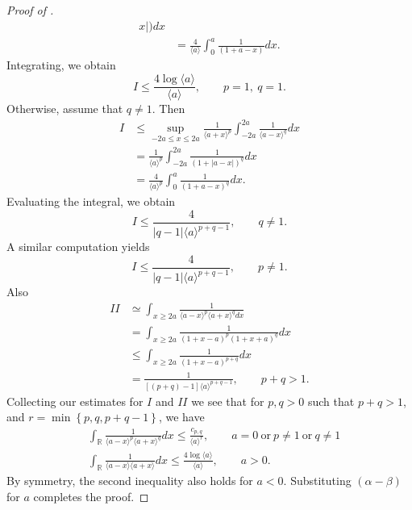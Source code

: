 \documentclass[12pt,reqno]{amsart}
\numberwithin{equation}{section}  %
\renewcommand{\cref}{\Cref}
\newcommand{\rr}{\mathbb{R}}
\begin{document}
\begin{proof}[Proof of \cref{lem:calc}]
\begin{equation*}
\begin{split}
{x
|)} d x
\\
& = \frac{4}{\langle a \rangle} \int_{0}^{a} \frac{1}{(1 + a -
x)} d x.
\end{split}
\end{equation*}
Integrating, we obtain
\begin{equation*}
I
\le 
\frac{4 \log \langle a \rangle}{\langle a \rangle}, \qquad p =1, \ q =1.
\end{equation*}
Otherwise, assume that $q \neq 1$. Then
\begin{equation*}
\begin{split}
I
& \le \sup_{-2a \le x \le 2a} \frac{1}{\langle a + x \rangle
^{p}} \int_{-2a}^{2a} \frac{1}{\langle a - x \rangle ^{q}} d x
\\
& = \frac{1}{\langle a \rangle ^{p}} \int_{-2a}^{2a} \frac{1}{(1 + | a -
x
|)^{q}} d x
\\
& = \frac{4}{\langle a \rangle ^{p}} \int_{0}^{a} \frac{1}{(1 + a -
x)^{q}} d x.
\end{split}
\end{equation*}
Evaluating the integral, we obtain
\begin{equation*}
I \le \frac{4}{|q-1| \langle a \rangle ^{p +q -1}}, \qquad q \neq 1.
\end{equation*}
A similar computation yields
\begin{equation*}
I \le \frac{4}{|q-1| \langle a \rangle ^{p +q -1}}, \qquad p \neq 1.
\end{equation*}
Also
\begin{equation*}
\begin{split}
II 
& \simeq \int_{x \ge 2a} \frac{1}{\langle a - x \rangle ^{p} \langle a
+ x \rangle ^{q} d x}
\\ 
& = \int_{x \ge 2a} \frac{1}{(1 + x - a)^{p} (1 + x +
a)^{q}} d x
\\
& \le \int_{x \ge 2a} \frac{1}{(1 + x -a)^{p+q}} d x
\\
& = \frac{1}{[(p + q)-1] \langle a \rangle ^{p+q -1}}, \qquad p + q > 1.
\end{split}
\end{equation*}
Collecting our estimates for $I$ and $II$ we see that for 
$p, q > 0$ such that $p +q >1$, and $r =\min\left\{p, q, p+q-1
\right\}$, we have 
\begin{align*}
& \int_{\rr} \frac{1}{\langle a - x \rangle ^{p} \langle a + x \rangle
^{q}} d x
\le \frac{c_{p,q}}{\langle a \rangle ^{r}}, \qquad a = 0 \ \text{or} \
p \neq 1 \ \text{or} \ q \neq 1
\\
& \int_{\rr} \frac{1}{\langle a - x \rangle  \langle a + x \rangle
} d x
\le  \frac{4 \log \langle a \rangle}{\langle a \rangle}, \qquad a > 0.
\label{est-2}
\end{align*}
By symmetry, the second inequality also holds for $a < 0$. Substituting $(\alpha -
\beta)$ for $a$ completes the proof.
\end{proof}
\end{document}
